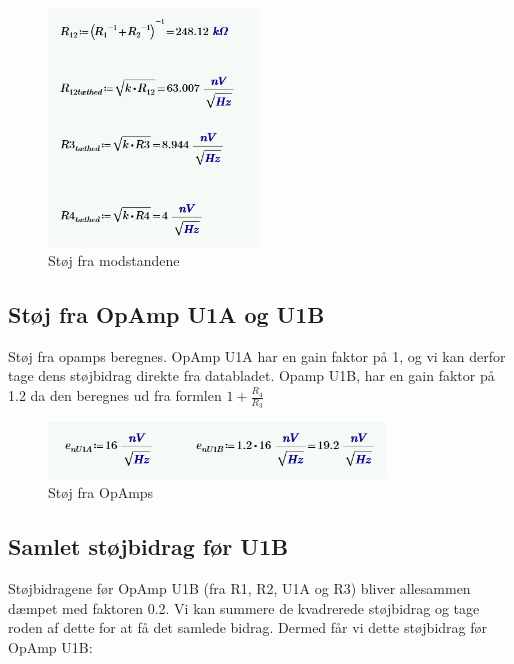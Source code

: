 \documentclass[a4paper, 11pt, article,oneside,openany]{memoir} %
\begin{document}
\begin{figure}[ht] %
	\centering
	\includegraphics[width=0.5\textwidth]{figure/modstandsstoej}
	\caption{Støj fra modstandene}
	\label{fig:modstandsstoej}
\end{figure}



\subsection{Støj fra OpAmp U1A og U1B}

Støj fra opamps beregnes. OpAmp U1A har en gain faktor på 1, og vi kan derfor tage dens støjbidrag direkte fra databladet. Opamp U1B, har en gain faktor på 1.2 da den beregnes ud fra formlen
$1 + \frac{R_4}{R_3}$

\begin{figure}[ht] %
	\centering
	\includegraphics[width=0.8\textwidth]{figure/opampstoej}
	\caption{Støj fra OpAmps}
	\label{fig:opampstoej}
\end{figure}









\subsection{Samlet støjbidrag før U1B}

Støjbidragene før OpAmp U1B (fra R1, R2, U1A og R3) bliver allesammen dæmpet med faktoren 0.2.
Vi kan summere de kvadrerede støjbidrag og tage roden af dette for at få det samlede bidrag.
Dermed får vi dette støjbidrag før OpAmp U1B:
\end{document}
